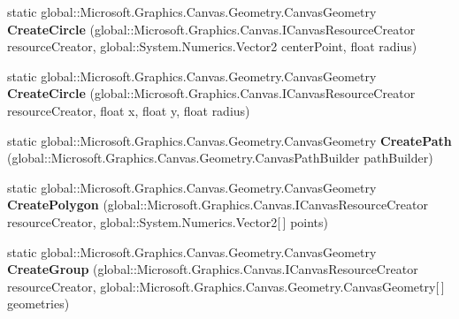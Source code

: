 \begin{DoxyCompactItemize}
\item 
\mbox{\label{class_microsoft_1_1_graphics_1_1_canvas_1_1_geometry_1_1_canvas_geometry_a098a43184492d859176fd9ccac7a99b9}} 
static global\+::\+Microsoft.\+Graphics.\+Canvas.\+Geometry.\+Canvas\+Geometry {\bfseries Create\+Circle} (global\+::\+Microsoft.\+Graphics.\+Canvas.\+I\+Canvas\+Resource\+Creator resource\+Creator, global\+::\+System.\+Numerics.\+Vector2 center\+Point, float radius)
\item 
\mbox{\label{class_microsoft_1_1_graphics_1_1_canvas_1_1_geometry_1_1_canvas_geometry_aa92a58291260e1f96f156e7d47e03c3d}} 
static global\+::\+Microsoft.\+Graphics.\+Canvas.\+Geometry.\+Canvas\+Geometry {\bfseries Create\+Circle} (global\+::\+Microsoft.\+Graphics.\+Canvas.\+I\+Canvas\+Resource\+Creator resource\+Creator, float x, float y, float radius)
\item 
\mbox{\label{class_microsoft_1_1_graphics_1_1_canvas_1_1_geometry_1_1_canvas_geometry_a7a89ba595e7afee0fe55e1dd7c7c4315}} 
static global\+::\+Microsoft.\+Graphics.\+Canvas.\+Geometry.\+Canvas\+Geometry {\bfseries Create\+Path} (global\+::\+Microsoft.\+Graphics.\+Canvas.\+Geometry.\+Canvas\+Path\+Builder path\+Builder)
\item 
\mbox{\label{class_microsoft_1_1_graphics_1_1_canvas_1_1_geometry_1_1_canvas_geometry_a1f5119d034d404cb9dc30ac067fcc1d1}} 
static global\+::\+Microsoft.\+Graphics.\+Canvas.\+Geometry.\+Canvas\+Geometry {\bfseries Create\+Polygon} (global\+::\+Microsoft.\+Graphics.\+Canvas.\+I\+Canvas\+Resource\+Creator resource\+Creator, global\+::\+System.\+Numerics.\+Vector2\mbox{[}$\,$\mbox{]} points)
\item 
\mbox{\label{class_microsoft_1_1_graphics_1_1_canvas_1_1_geometry_1_1_canvas_geometry_a9905813ee5fbbed32289fa93a3ecaed8}} 
static global\+::\+Microsoft.\+Graphics.\+Canvas.\+Geometry.\+Canvas\+Geometry {\bfseries Create\+Group} (global\+::\+Microsoft.\+Graphics.\+Canvas.\+I\+Canvas\+Resource\+Creator resource\+Creator, global\+::\+Microsoft.\+Graphics.\+Canvas.\+Geometry.\+Canvas\+Geometry\mbox{[}$\,$\mbox{]} geometries)

\end{DoxyCompactItemize}
